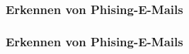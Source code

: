 \begin{frame}
\frametitle{Erkennen von Phising-E-Mails}
\begin{itemize}
  
\end{itemize}
\end{frame}

\begin{frame}
\frametitle{Erkennen von Phising-E-Mails}
\begin{itemize}
  
\end{itemize}
\end{frame}